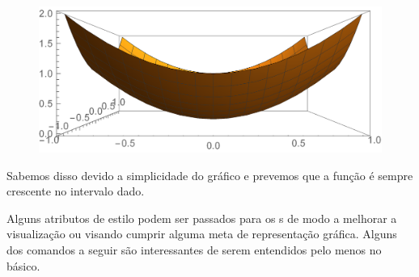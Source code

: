 \documentclass[a4paper, 12pt]{article}
\begin{document}
	\begin{figure}[!h]\label{parabola}
		\centering
		\includegraphics[scale=.55]{images/parabola3dfront}
	\end{figure}

	Sabemos disso devido a simplicidade do gráfico e prevemos que a função é sempre crescente no intervalo dado.
	
	Alguns atributos de estilo podem ser passados para os s de modo a melhorar a visualização ou visando cumprir alguma meta de representação gráfica. Alguns dos comandos a seguir são interessantes de serem entendidos pelo menos no básico.
	
\end{document}
